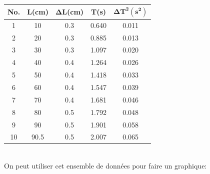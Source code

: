 \documentclass[12pt,a4paper]{article}
\begin{document}
    \begin{table}[htbp]
        \centering
        \begin{minipage}{0.55\textwidth}
            \begin{tabular}{c|c|c|c|c}
                \textbf{No.} & \textbf{L(cm)} & \textbf{$\bm{\Delta}$L(cm)} & \textbf{T(s)} & \textbf{$\bm{\Delta T^2(s^2)}$} \\
                \toprule
                1 & 10 & 0.3 & 0.640 & 0.011 \\
                2 & 20 & 0.3 & 0.885 & 0.013 \\
                3 & 30 & 0.3 & 1.097 & 0.020 \\
                4 & 40 & 0.4 & 1.264 & 0.026 \\
                5 & 50 & 0.4 & 1.418 & 0.033 \\
                6 & 60 & 0.4 & 1.547 & 0.039 \\
                7 & 70 & 0.4 & 1.681 & 0.046\\
                8 & 80 & 0.5 & 1.792 & 0.048 \\
                9 & 90 & 0.5 & 1.901 & 0.058\\
                10 & 90.5 & 0.5 & 2.007 & 0.065 \\
            \end{tabular}
        \end{minipage}%
        \begin{minipage}{0.45\textwidth}
            \centering
        \end{minipage}
    \end{table} \\
    On peut utiliser cet ensemble de données pour faire un graphique: \\
    \\
    \expIdata
\end{document}
